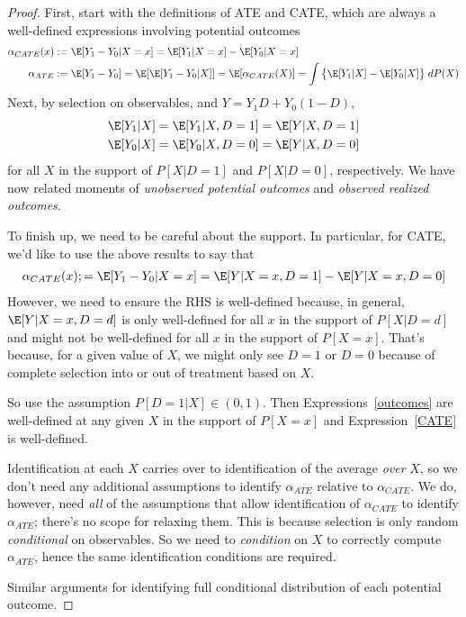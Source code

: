 \documentclass[12pt]{article}
\theoremstyle{plain}
\theoremstyle{definition}
\theoremstyle{remark}
\begin{document}
\begin{proof}
First, start with the definitions of ATE and CATE, which are always a
well-defined expressions involving potential outcomes
\begin{align*}
  \alpha_{CATE}(x)
  &:=
  \E[Y_1-Y_0|X=x]
  =
  \E[Y_1|X=x]
  -
  \E[Y_0|X=x]
  \\
  \alpha_{ATE}
  &:=
  \E[Y_1-Y_0]
  =
  \E[\E[Y_1-Y_0|X]]
  =
  \E[\alpha_{CATE}(X)]
  =
  \int
  \big\{
  \E[Y_1|X]
  -
  \E[Y_0|X]
  \big\}
  \;
  dP(X)
\end{align*}
Next, by selection on observables, and $Y=Y_1 D + Y_0(1-D)$,
\begin{align}
  \E[Y_1|X]
  &=
  \E[Y_1|X,D=1]
  =
  \E[Y|X,D=1]
  \\
  \E[Y_0|X]
  &=
  \E[Y_0|X,D=0]
  =
  \E[Y|X,D=0]
  \label{outcomes}
\end{align}
for all $X$ in the support of $P[X|D=1]$ and $P[X|D=0]$, respectively.
We have now related moments of
\emph{unobserved potential outcomes}
and
\emph{observed realized outcomes}.


To finish up, we need to be careful about the support.
In particular, for CATE, we'd like to use the above results to say that
\begin{align}
  \alpha_{CATE}(x)
  ;=
  \E[Y_1-Y_0|X=x]
  =
  \E[Y|X=x,D=1]
  -
  \E[Y|X=x,D=0]
  \label{CATE}
\end{align}
However, we need to ensure the RHS is well-defined because, in general,
$\E[Y|X=x,D=d]$ is only well-defined for all $x$ in the support of
$P[X|D=d]$ and might not be well-defined for all $x$ in the support of
$P[X=x]$.
That's because, for a given value of $X$, we might only see $D=1$ or
$D=0$ because of complete selection into or out of treatment based on
$X$.

So use the assumption $P[D=1|X]\in (0,1)$.
Then Expressions~\ref{outcomes} are well-defined at any given $X$ in the
support of $P[X=x]$ and Expression~\ref{CATE} is well-defined.

Identification at each $X$ carries over to identification of the
average \emph{over} $X$, so we don't need any additional assumptions
to identify $\alpha_{ATE}$ relative to $\alpha_{CATE}$.
We do, however, need \emph{all} of the assumptions that allow
identification of $\alpha_{CATE}$ to identify $\alpha_{ATE}$;
there's no scope for relaxing them.
This is because selection is only random \emph{conditional} on
observables.
So we need to \emph{condition} on $X$ to correctly compute
$\alpha_{ATE}$, hence the same identification conditions are
required.

Similar arguments for identifying full conditional distribution
of each potential outcome.
\end{proof}
\end{document}
